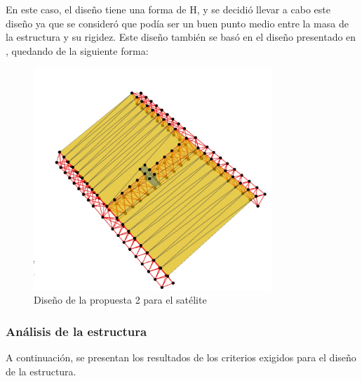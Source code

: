 En este caso, el diseño tiene una forma de H, y se decidió llevar a cabo este diseño ya que se consideró que podía ser un buen punto medio entre la masa de la estructura y su rigidez. Este diseño también se basó en el diseño presentado en \cite{hoyt2014trusselator}, quedando de la siguiente forma:

\begin{figure}[H]
    \centering
    \includegraphics[width=0.8\textwidth]{GRAFICOS_DISENO_BENO/propuesta2.png}
    \caption{Diseño de la propuesta 2 para el satélite}
    \label{fig:propuesta2}
\end{figure}

\subsubsection{Análisis de la estructura}

A continuación, se presentan los resultados de los criterios exigidos para el diseño de la estructura.

